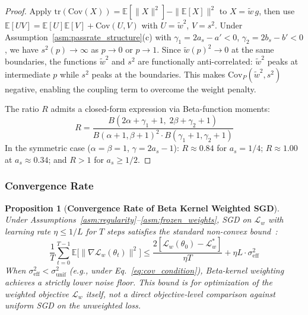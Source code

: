 \documentclass{article}
\newtheorem{proposition}[theorem]{Proposition}
\begin{document}
\begin{proof}
Apply $\text{tr}(\text{Cov}(X)) = \mathbb{E}[\|X\|^2] - \|\mathbb{E}[X]\|^2$ to $X = \tilde{w}\,g$, then use $\mathbb{E}[UV] = \mathbb{E}[U]\mathbb{E}[V] + \text{Cov}(U,V)$ with $U = \tilde{w}^2$, $V = s^2$. Under Assumption~\ref{asm:passrate_structure}(c) with $\gamma_1 = 2a_s - a' < 0$, $\gamma_2 = 2b_s - b' < 0$, we have $s^2(p) \to \infty$ as $p \to 0$ or $p \to 1$. Since $\tilde{w}(p)^2 \to 0$ at the same boundaries, the functions $\tilde{w}^2$ and $s^2$ are functionally anti-correlated: $\tilde{w}^2$ peaks at intermediate $p$ while $s^2$ peaks at the boundaries. This makes $\text{Cov}_P(\tilde{w}^2, s^2)$ negative, enabling the coupling term to overcome the weight penalty.

The ratio $R$ admits a closed-form expression via Beta-function moments:
\begin{equation}
 R = \frac{B(2\alpha + \gamma_1 + 1,\; 2\beta + \gamma_2 + 1)}{B(\alpha+1, \beta+1)^2 \cdot B(\gamma_1+1, \gamma_2+1)}
 \label{eq:R_beta}
\end{equation}
In the symmetric case ($\alpha = \beta = 1$, $\gamma = 2a_s - 1$): $R \approx 0.84$ for $a_s = 1/4$; $R \approx 1.00$ at $a_s \approx 0.34$; and $R > 1$ for $a_s \geq 1/2$.
\end{proof}

\subsubsection{Convergence Rate}

\begin{proposition}[\textbf{Convergence Rate of Beta Kernel Weighted SGD}]
\label{thm:convergence}
Under Assumptions~\ref{asm:regularity}--\ref{asm:frozen_weights}, SGD on $\mathcal{L}_w$ with learning rate $\eta \leq 1/L$ for $T$ steps satisfies the standard non-convex bound~\citep{ghadimi2013sgd}:
\begin{equation}
 \frac{1}{T}\sum_{t=0}^{T-1} \mathbb{E}\!\big[\|\nabla \mathcal{L}_w(\theta_t)\|^2\big] \leq \frac{2[\mathcal{L}_w(\theta_0) - \mathcal{L}_w^*]}{\eta T} + \eta L \cdot \sigma_{\text{eff}}^2
\end{equation}
When $\sigma_{\text{eff}}^2 < \sigma_{\text{unif}}^2$ (e.g., under Eq.~\eqref{eq:cov_condition}), Beta-kernel weighting achieves a strictly lower noise floor.
This bound is for optimization of the weighted objective $\mathcal{L}_w$ itself, not a direct objective-level comparison against uniform SGD on the unweighted loss.
\end{proposition}
\end{document}
